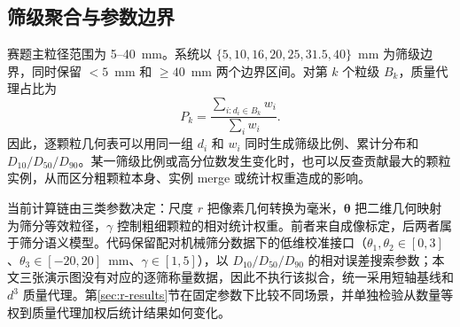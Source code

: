 \subsection{筛级聚合与参数边界}

赛题主粒径范围为 5--40~mm。系统以 $\{5,10,16,20,25,31.5,40\}$~mm 为筛级边界，同时保留 $<5$~mm 和 $\ge40$~mm 两个边界区间。对第 $k$ 个粒级 $B_k$，质量代理占比为
\begin{equation}
 P_k=\frac{\sum_{i:d_i\in B_k}w_i}{\sum_iw_i}.
\label{eq:r-bin}
\end{equation}
因此，逐颗粒几何表可以用同一组 $d_i$ 和 $w_i$ 同时生成筛级比例、累计分布和 $D_{10}/D_{50}/D_{90}$。某一筛级比例或高分位数发生变化时，也可以反查贡献最大的颗粒实例，从而区分粗颗粒本身、实例 merge 或统计权重造成的影响。

当前计算链由三类参数决定：尺度 $r$ 把像素几何转换为毫米，$\boldsymbol{\theta}$ 把二维几何映射为筛分等效粒径，$\gamma$ 控制粗细颗粒的相对统计权重。前者来自成像标定，后两者属于筛分语义模型。代码保留配对机械筛分数据下的低维校准接口（$\theta_1,\theta_2\in[0,3]$、$\theta_3\in[-20,20]$~mm、$\gamma\in[1,5]$），以 $D_{10}/D_{50}/D_{90}$ 的相对误差搜索参数；本文三张演示图没有对应的逐筛称量数据，因此不执行该拟合，统一采用短轴基线和 $d^3$ 质量代理。第\ref{sec:r-results}节在固定参数下比较不同场景，并单独检验从数量等权到质量代理加权后统计结果如何变化。
